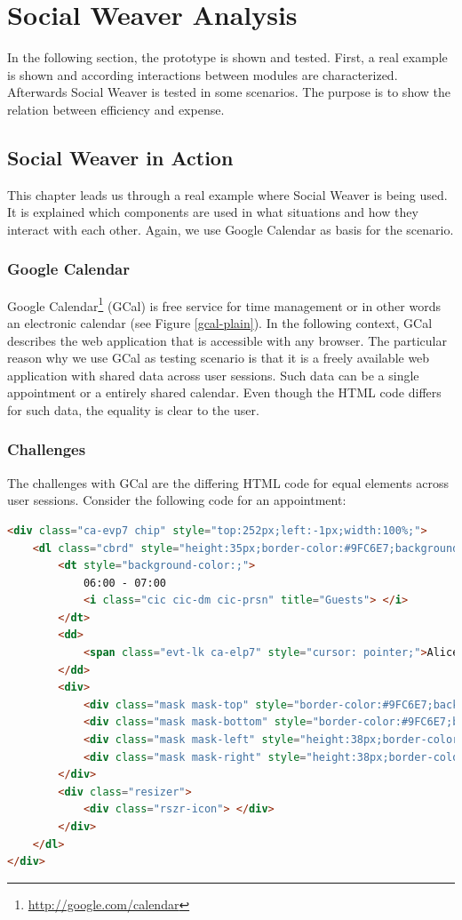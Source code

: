 \section{Social Weaver Analysis}
In the following section, the prototype is shown and tested. First, a real example is shown and according interactions between modules are characterized. Afterwards Social Weaver is tested in some scenarios. The purpose is to show the relation between efficiency and expense. 

\subsection{Social Weaver in Action}
This chapter leads us through a real example where Social Weaver is being used. It is explained which components are used in what situations and how they interact with each other. Again, we use Google Calendar as basis for the scenario.

\subsubsection{Google Calendar}
Google Calendar\footnote{\url{http://google.com/calendar}} (GCal) is free service for time management or in other words an electronic calendar (see Figure \ref{gcal-plain}). In the following context, GCal describes the web application that is accessible with any browser. The particular reason why we use GCal as testing scenario is that it is a freely available web application with shared data across user sessions. Such data can be a single appointment or a entirely shared calendar. Even though the HTML code differs for such data, the equality is clear to the user.

\subsubsection{Challenges}
The challenges with GCal are the differing HTML code for equal elements across user sessions. Consider the following code for an appointment:

\begin{lstlisting}[language=HTML]
<div class="ca-evp7 chip" style="top:252px;left:-1px;width:100%;">
	<dl class="cbrd" style="height:35px;border-color:#9FC6E7;background-color:#E4EFF8;color:#777777;">
		<dt style="background-color:;">
			06:00 - 07:00
			<i class="cic cic-dm cic-prsn" title="Guests"> </i>
		</dt>
		<dd>
			<span class="evt-lk ca-elp7" style="cursor: pointer;">Alice and Bob Meeting</span>
		</dd>
		<div>
			<div class="mask mask-top" style="border-color:#9FC6E7;background-color:#E4EFF8;"> </div>
			<div class="mask mask-bottom" style="border-color:#9FC6E7;background-color:#E4EFF8;"> </div>
			<div class="mask mask-left" style="height:38px;border-color:#9FC6E7;background-color:#E4EFF8;"> </div>
			<div class="mask mask-right" style="height:38px;border-color:#9FC6E7;background-color:#E4EFF8;"> </div>
		</div>
		<div class="resizer">
			<div class="rszr-icon"> </div>
		</div>
	</dl>
</div>
\end{lstlisting}

